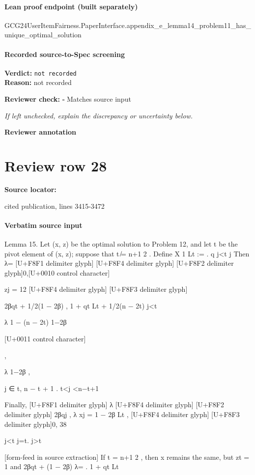 \documentclass[10pt]{article}
\newcommand{\reviewerbox}{%
  \par\noindent\fbox{\parbox{0.96\linewidth}{\rule{0pt}{0.38in}}}\par
}
\newcommand{\reviewmatch}[1]{%
  \par\noindent\textbf{Reviewer check:} $\square$\; #1\par
  \noindent\emph{If left unchecked, explain the discrepancy or uncertainty below.}\par
}
\begin{document}
\paragraph{Lean proof endpoint (built separately)}\begin{ReviewVerbatim}
GCG24UserItemFairness.PaperInterface.appendix_e_lemma14_problem11_has_unique_optimal_solution
\end{ReviewVerbatim}

\paragraph{Recorded source-to-Spec screening}
\textbf{Verdict:} \texttt{not recorded}
\\
\textbf{Reason:} not recorded
\reviewmatch{Matches source input}
\noindent\textbf{Reviewer annotation}\par
\reviewerbox
\clearpage
\hypertarget{source-claim-2442d32f650b179f}{}
\section*{Review row 28}
\textbf{Source locator:} {\footnotesize\raggedright cited publication, lines 3415-\allowbreak{}3472\par}
\paragraph{Verbatim source input}
\begin{ReviewVerbatim}
Lemma 15. Let (x, z) be the optimal solution to Problem 12, and let t be the pivot element of (x, z);
suppose that t ̸= n+1
2 . Define
X 1
Lt :=
.
q
j<t j
Then
λ=
[U+F8F1 delimiter glyph]
[U+F8F4 delimiter glyph]
[U+F8F2 delimiter glyph]0,[U+0010 control character]

zj = 12
[U+F8F4 delimiter glyph]
[U+F8F3 delimiter glyph]

2βqt + 1/2(1 − 2β)
,
1 + qt Lt + 1/2(n − 2t)
j<t

λ
1 − (n − 2t) 1−2β

[U+0011 control character]

,

λ
1−2β ,

j ∈ {t, n − t + 1} .
t<j <n−t+1

Finally,
[U+F8F1 delimiter glyph]
λ
[U+F8F4 delimiter glyph]
[U+F8F2 delimiter glyph] 2βqj ,
λ
xj = 1 − 2β
Lt ,
[U+F8F4 delimiter glyph]
[U+F8F3 delimiter glyph]0,
38

j<t
j=t.
j>t


[form-feed in source extraction]
If t = n+1
2 , then x remains the same, but zt = 1 and
2βqt + (1 − 2β)
λ=
.
1 + qt Lt
\end{ReviewVerbatim}
\end{document}
